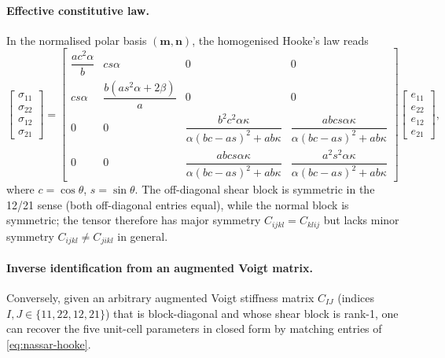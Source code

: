 \documentclass{article}
\begin{document}
\paragraph{Effective constitutive law.}
In the normalised polar basis $(\mathbf{m},\mathbf{n})$, the homogenised
Hooke's law reads
\begin{equation}
\begin{bmatrix}
\sigma_{11} \\ \sigma_{22} \\ \sigma_{12} \\ \sigma_{21}
\end{bmatrix}
=
\begin{bmatrix}
\dfrac{ac^2\alpha}{b} & cs\alpha & 0 & 0 \\[6pt]
cs\alpha & \dfrac{b(as^2\alpha+2\beta)}{a} & 0 & 0 \\[6pt]
0 & 0 & \dfrac{b^2c^2\alpha\kappa}{\alpha(bc-as)^2+ab\kappa} &
          \dfrac{abcs\alpha\kappa}{\alpha(bc-as)^2+ab\kappa} \\[6pt]
0 & 0 & \dfrac{abcs\alpha\kappa}{\alpha(bc-as)^2+ab\kappa} &
          \dfrac{a^2s^2\alpha\kappa}{\alpha(bc-as)^2+ab\kappa}
\end{bmatrix}
\begin{bmatrix}
e_{11} \\ e_{22} \\ e_{12} \\ e_{21}
\end{bmatrix},
\label{eq:nassar-hooke}
\end{equation}
where $c=\cos\theta$, $s=\sin\theta$.  The off-diagonal shear block is
symmetric in the 12/21 sense (both off-diagonal entries equal), while the
normal block is symmetric; the tensor therefore has major symmetry
$C_{ijkl}=C_{klij}$ but lacks minor symmetry $C_{ijkl}\neq C_{jikl}$ in
general.


\paragraph{Inverse identification from an augmented Voigt matrix.}
Conversely, given an arbitrary augmented Voigt stiffness matrix $C_{IJ}$
(indices $I,J\in\{11,22,12,21\}$) that is block-diagonal and whose shear
block is rank-1, one can recover the five unit-cell parameters in closed form
by matching entries of \eqref{eq:nassar-hooke}.  
\end{document}
